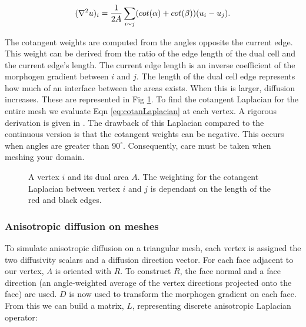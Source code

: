 \begin{equation}
	(\nabla^2{} u)_i = \frac{1}{2A} \sum_{i \sim j} (cot(\alpha) + cot(\beta)) (u_i - u_j).
	\label{eq:cotanLaplacian}
\end{equation}

The cotangent weights are computed from the angles opposite the current edge. This weight can be derived from the ratio of the edge length of the dual cell and the current edge's length. The current edge length is an inverse coefficient of the morphogen gradient between $i$ and $j$. The length of the dual cell edge represents how much of an interface between the areas exists. When this is larger, diffusion increases. These are represented in Fig \ref{fig:dualMesh}. To find the cotangent Laplacian for the entire mesh we evaluate Eqn \ref{eq:cotanLaplacian} at each vertex. A rigorous derivation is given in \citep{Crane2013DGP}. The drawback of this Laplacian compared to the continuous version is that the cotangent weights can be negative. This occurs when angles are greater than $90^\circ$. Consequently, care must be taken when meshing your domain.

\begin{figure}[H]
	\centering
	\caption{A vertex $i$ and its dual area $A$. The weighting for the cotangent Laplacian between vertex $i$ and $j$ is dependant on the length of the red and black edges.}
	\label{fig:dualMesh}
\end{figure}


\subsubsection*{Anisotropic diffusion on meshes}
To simulate anisotropic diffusion on a triangular mesh, each vertex is assigned the two diffusivity scalars and a diffusion direction vector. For each face adjacent to our vertex, $\Lambda$ is oriented with $R$. To construct $R$, the face normal and a face direction (an angle-weighted average of the vertex directions projected onto the face) are used. $D$ is now used to transform the morphogen gradient on each face. From this we can build a matrix, $L$, representing discrete anisotropic Laplacian operator:


